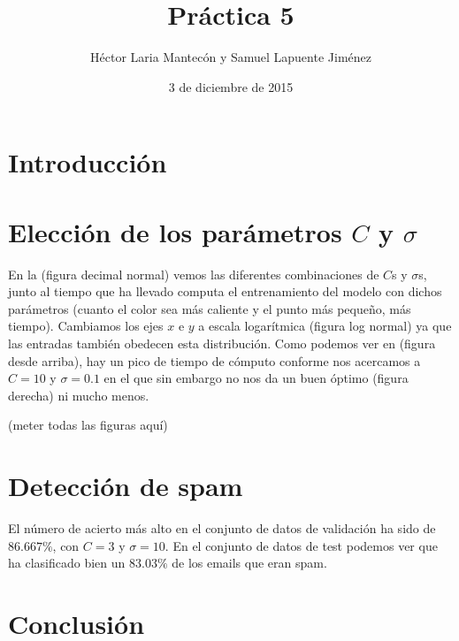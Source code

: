 \documentclass{article}
\title{Práctica 5}
\author{Héctor Laria Mantecón y Samuel Lapuente Jiménez}
\date{3 de diciembre de 2015}
\begin{document}
\maketitle

\section{Introducción}

\section{Elección de los parámetros $C$ y $\sigma$}
En la (figura decimal normal) vemos las diferentes combinaciones de $C$s y $\sigma$s, junto al tiempo que ha llevado computa el entrenamiento del modelo con dichos parámetros (cuanto el color sea más caliente y el punto más pequeño, más tiempo).
Cambiamos los ejes $x$ e $y$ a escala logarítmica (figura log normal) ya que las entradas también obedecen esta distribución.
Como podemos ver en (figura desde arriba), hay un pico de tiempo de cómputo conforme nos acercamos a $C = 10$ y $\sigma = 0.1$ en el que sin embargo no nos da un buen óptimo (figura derecha) ni mucho menos.

(meter todas las figuras aquí)

\section{Detección de spam}
El número de acierto más alto en el conjunto de datos de validación ha sido de $86.667\%$, con $C = 3$ y $\sigma = 10$.
En el conjunto de datos de test podemos ver que ha clasificado bien un $83.03\%$ de los emails que eran spam.

\section{Conclusión}
\end{document}
